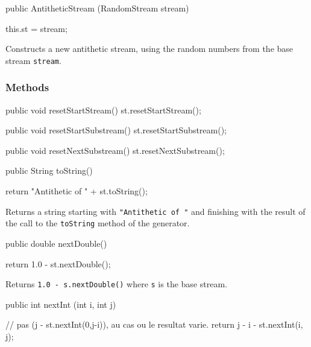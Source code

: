 \begin{code}

   public AntitheticStream (RandomStream stream) \begin{hide} {
      this.st = stream;
   } \end{hide}
\end{code}
\begin{tabb} Constructs a new antithetic stream, using the random numbers
  from the base stream \texttt{stream}.
\end{tabb}

\subsubsection* {Methods}
\begin{code}\begin{hide}
   public void resetStartStream() {
      st.resetStartStream();
   }

   public void resetStartSubstream() {
      st.resetStartSubstream();
   }

   public void resetNextSubstream() {
      st.resetNextSubstream();
   }\end{hide}

   public String toString() \begin{hide} {
      return "Antithetic of " + st.toString();
   }\end{hide}
\end{code}
\begin{tabb} Returns a string starting with \texttt{"Antithetic of "}
  and finishing with the result of the call to the \texttt{toString}
  method of the generator.
\end{tabb}
\begin{code}

   public double nextDouble() \begin{hide} {
      return 1.0 - st.nextDouble();
   }\end{hide}
\end{code}
\begin{tabb} Returns \texttt{1.0 - s.nextDouble()} where \texttt{s} is the 
  base stream.
\end{tabb}
\begin{code}

   public int nextInt (int i, int j) \begin{hide} {
      // pas (j - st.nextInt(0,j-i)), au cas ou le resultat varie.
      return j - i - st.nextInt(i, j);
   }\end{hide}
\end{code}
